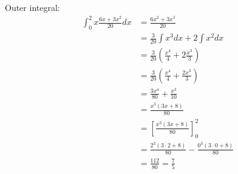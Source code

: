 Outer integral:
\begin{align*}
	\int_0^2 x \frac{6x + 3x^2}{20} dx & = \frac{6x^2 + 3x^3}{20}                                                           \\
	                                   & = \frac{3}{20}\int x^3 dx + 2\int x^2 dx                                           \\
	                                   & = \frac{3}{20}\left(\frac{x^4}{4} + 2 \frac{x^3}{3}\right)                         \\
	                                   & = \frac{3}{20}\left(\frac{x^4}{4} + \frac{2x^3}{3}\right)                          \\
	                                   & = \frac{3x^4}{80} + \frac{x^3}{10}                                                 \\
	                                   & = \frac{x^3 \left(3x+8\right)}{80}                                                 \\
	                                   & = \left[\frac{x^3 \left(3x+8\right)}{80}\right]_0^2                                \\
	                                   & = \frac{2^3 \left(3\cdot 2+8\right)}{80} - \frac{0^3 \left(3 \cdot 0+8\right)}{80} \\
	                                   & = \frac{112}{80} = \frac{7}{5}
\end{align*}
